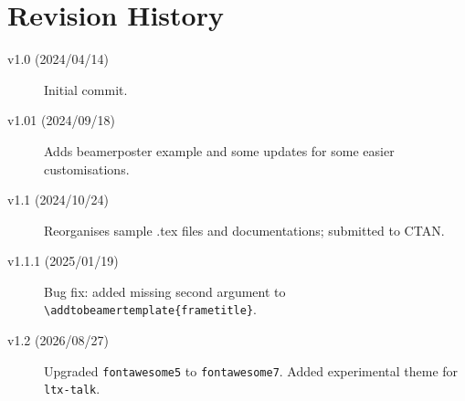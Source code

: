\documentclass{article}
\begin{document}
\section{Revision History}
\begin{description}
\item[v1.0 (2024/04/14)] Initial commit.
\item[v1.01 (2024/09/18)] Adds beamerposter example and some updates for some easier customisations.
\item[v1.1 (2024/10/24)] Reorganises sample .tex files and documentations; submitted to CTAN.
\item[v1.1.1 (2025/01/19)] Bug fix: added missing second argument to \verb|\addtobeamertemplate{frametitle}|.
\item[v1.2 (2026/08/27)] Upgraded \texttt{fontawesome5} to \texttt{fontawesome7}. Added experimental theme for \texttt{ltx-talk}.
\end{description}
\end{document}
